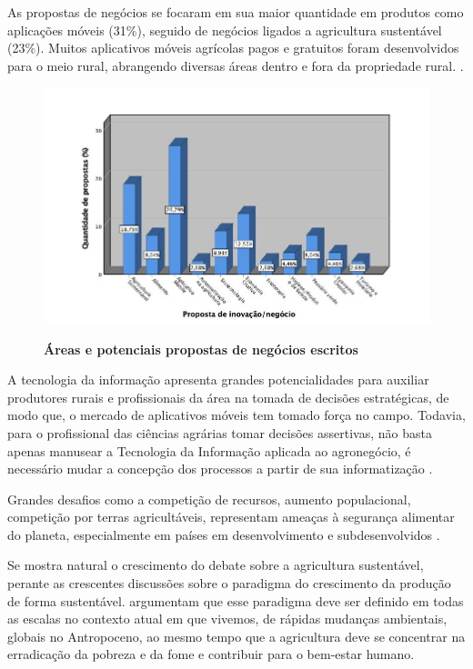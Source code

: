 As propostas de negócios se focaram em sua maior quantidade em produtos como aplicações móveis (31\%), seguido de negócios ligados a agricultura sustentável (23\%). Muitos aplicativos móveis agrícolas pagos e gratuitos foram desenvolvidos para o meio rural, abrangendo diversas áreas dentro e fora da propriedade rural. \cite{silva_caracterizacao_2017}. 




\begin{figure}[H]
\centering
\caption{\textbf{Áreas e potenciais propostas de negócios escritos}}
\includegraphics[scale=0.6]{Imagens/propostas_negocios.jpg}
\label{figura_11}
\end{figure}


A tecnologia da informação apresenta grandes potencialidades para auxiliar produtores rurais e profissionais da área na tomada de decisões estratégicas, de modo que, o mercado de aplicativos móveis tem tomado força no campo. Todavia, para o profissional das ciências agrárias tomar decisões assertivas, não basta apenas manusear a Tecnologia da Informação aplicada ao agronegócio, é necessário mudar a concepção dos processos a partir de sua informatização \cite{ferraz_tecnologia_2017,sharma_systematic_2020}.

Grandes desafios como a competição de recursos, aumento populacional, competição por terras agricultáveis, representam ameaças à segurança alimentar do planeta, especialmente em países em desenvolvimento e subdesenvolvidos \cite{pardey_bounds_2014}.

Se mostra natural o crescimento do debate sobre a agricultura sustentável, perante as crescentes discussões sobre o paradigma do crescimento da produção de forma sustentável.
 argumentam que esse paradigma deve ser definido em todas as escalas no contexto atual em que vivemos, de rápidas mudanças ambientais, globais no Antropoceno, ao mesmo tempo que a agricultura  deve se concentrar na erradicação da pobreza e da fome e contribuir para o bem-estar humano.

